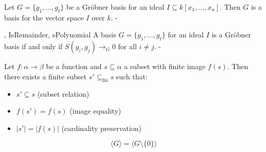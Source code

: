 \begin{lemma}\label{groebner_basis_is_basis}

  Let \( G = \{g_1, \ldots, g_t\} \) be a Gröbner basis for an ideal \( I \subseteq k[x_1, \ldots, x_n] \). Then \( G \) is a basis for the vector space \( I \) over \( k \).
-
\end{lemma}

\begin{lemma}\label{buchberger_criterion}

  ,
{IsRemainder},
{sPolynomial}
  A basis \( G = \{ g_1, \ldots, g_t \} \) for an ideal \( I \) is a Gröbner basis if and only if \( S(g_i, g_j) \to_G 0 \) for all \( i \neq j \).
-
\end{lemma}

\begin{lemma}\label{finset_subset_preimage_of_finite_image}
  \leanok

  Let $f: \alpha \to \beta$ be a function and $s \subseteq \alpha$ a subset with finite image $f(s)$. Then there exists a finite subset $s' \subseteq_{\text{fin}} s$ such that:
\begin{itemize}
\item $s' \subseteq s$ (subset relation)
\item $f(s') = f(s)$ (image equality)
\item $|s'| = |f(s)|$ (cardinality preservation)
\end{itemize}

\end{lemma}

\begin{lemma}\label{span_sdiff_singleton_zero}
  \leanok

  \[
\langle G \rangle = \langle G \setminus \{0\} \rangle
\]

\end{lemma}

